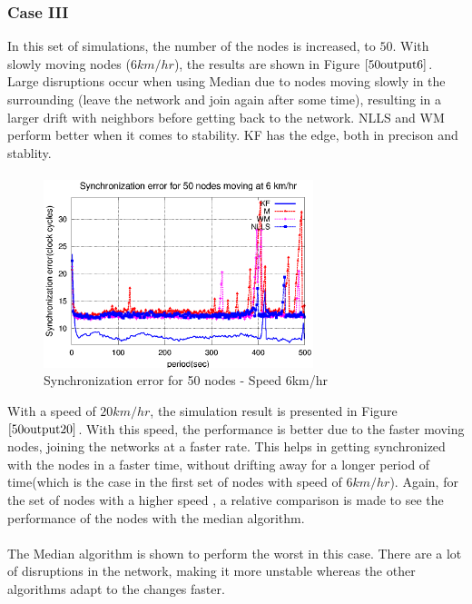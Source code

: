 \documentclass[a4paper,10pt]{report}
\begin{document}
\subsubsection{\textbf{Case III}}
In this set of simulations, the number of the nodes is increased, to $50$. With slowly moving nodes ($6km/hr$), the results are shown in Figure $\ref{50output6}$. Large disruptions occur when using Median due to nodes moving slowly in the surrounding (leave the network and join again after some time), resulting in a larger drift with neighbors before getting back to the network. NLLS and WM perform better when it comes to stability. KF has the edge, both in precison and stablity.
\paragraph*{}
\begin{figure}
\centering
\includegraphics[width=0.7\textwidth]{50output-s6}
\caption{Synchronization error for 50 nodes - Speed 6km/hr}
\label{50output6}
\end{figure}
With a speed of $20km/hr$, the simulation result is presented in Figure $\ref{50output20}$. With this speed, the performance is
better due to the faster moving nodes, joining the networks at a faster rate. This helps in getting synchronized with the nodes in a
faster time, without drifting away for a longer period of time(which is the case in the first set of nodes with speed of $6km/hr$).
Again, for the set of nodes with a higher speed , a relative comparison is made to see the performance of the nodes with the
median algorithm.\paragraph*{}
The Median algorithm is shown to perform the worst in this case. There are a lot of disruptions in the network, making it more unstable whereas the other algorithms adapt to the changes faster.
\end{document}
